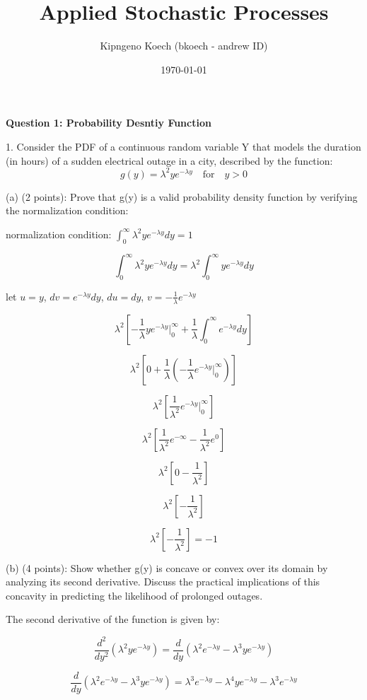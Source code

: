 \documentclass{article}
\title{Applied Stochastic Processes}
\author{Kipngeno Koech (bkoech - andrew ID)}
\date{\today}
\begin{document}
\maketitle
\begin{center}
    \large \textbf{Question 1: Probability Desntiy Function}
\end{center}

1. Consider the PDF of a continuous random variable Y that models the duration (in hours) of a
sudden electrical outage in a city, described by the function:
\[g(y) = \lambda^2ye^{-\lambda y} \quad \text{for} \quad y > 0\]

(a) (2 points): Prove that g(y) is a valid probability density function by verifying the normalization
condition:\newline

normalization condition: \(\int_{0}^{\infty}\lambda^2ye^{-\lambda y}dy = 1\)

\[\int_{0}^{\infty}\lambda^2ye^{-\lambda y}dy = \lambda^2\int_{0}^{\infty}ye^{-\lambda y}dy\]

let \(u = y\), \(dv = e^{-\lambda y}dy\), \(du = dy\), \(v = -\frac{1}{\lambda}e^{-\lambda y}\)

\[\lambda^2\left[-\frac{1}{\lambda}ye^{-\lambda y}\Big|_{0}^{\infty} + \frac{1}{\lambda}\int_{0}^{\infty}e^{-\lambda y}dy\right]\]

\[\lambda^2\left[0 + \frac{1}{\lambda}\left(-\frac{1}{\lambda}e^{-\lambda y}\Big|_{0}^{\infty}\right)\right]\]

\[\lambda^2\left[\frac{1}{\lambda^2}e^{-\lambda y}\Big|_{0}^{\infty}\right]\]

\[\lambda^2\left[\frac{1}{\lambda^2}e^{-\infty} - \frac{1}{\lambda^2}e^{0}\right]\]

\[\lambda^2\left[0 - \frac{1}{\lambda^2}\right]\]

\[\lambda^2\left[-\frac{1}{\lambda^2}\right]\]

\[\lambda^2\left[-\frac{1}{\lambda^2}\right] = -1\]

(b) (4 points): Show whether g(y) is concave or convex over its domain by analyzing its second
derivative. Discuss the practical implications of this concavity in predicting the likelihood of
prolonged outages.

The second derivative of the function is given by:

\[\frac{d^2}{dy^2}(\lambda^2ye^{-\lambda y}) = \frac{d}{dy}(\lambda^2e^{-\lambda y} - \lambda^3ye^{-\lambda y})\]

\[\frac{d}{dy}(\lambda^2e^{-\lambda y} - \lambda^3ye^{-\lambda y}) = \lambda^3e^{-\lambda y} - \lambda^4ye^{-\lambda y} - \lambda^3e^{-\lambda y}\]
\end{document}
